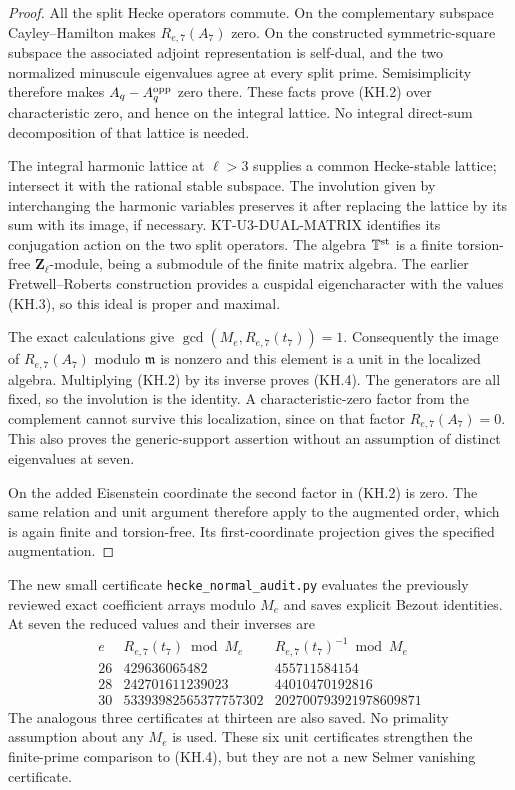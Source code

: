 \begin{proof}
All the split Hecke operators commute.  On the complementary
subspace Cayley--Hamilton makes $R_{e,7}(A_7)$ zero.  On the
constructed symmetric-square subspace the associated adjoint
representation is self-dual, and the two normalized minuscule
eigenvalues agree at every split prime.  Semisimplicity therefore
makes $A_q-A_q^{\rm opp}$ zero there.  These facts prove (KH.2)
over characteristic zero, and hence on the integral lattice.
No integral direct-sum decomposition of that lattice is needed.

The integral harmonic lattice at $\ell>3$ supplies a common
Hecke-stable lattice; intersect it with the rational stable
subspace.  The involution given by interchanging the harmonic
variables preserves it after replacing the lattice by its sum
with its image, if necessary.  KT-U3-DUAL-MATRIX identifies its
conjugation action on the two split operators.  The algebra
$\mathbb T^{\rm st}$ is a finite torsion-free
$\mathbf Z_\ell$-module, being a submodule of the finite matrix
algebra.  The earlier Fretwell--Roberts construction provides a
cuspidal eigencharacter with the values (KH.3), so this ideal is
proper and maximal.

The exact calculations give
$\gcd(M_e,R_{e,7}(t_7))=1$.  Consequently the image of
$R_{e,7}(A_7)$ modulo $\mathfrak m$ is nonzero and this element
is a unit in the localized algebra.  Multiplying (KH.2) by its
inverse proves (KH.4).  The generators are all fixed, so the
involution is the identity.  A characteristic-zero factor from
the complement cannot survive this localization, since on that
factor $R_{e,7}(A_7)=0$.  This also proves the generic-support
assertion without an assumption of distinct eigenvalues at seven.

On the added Eisenstein coordinate the second factor in (KH.2)
is zero.  The same relation and unit argument therefore apply
to the augmented order, which is again finite and torsion-free.
Its first-coordinate projection gives the specified augmentation.
\end{proof}

The new small certificate \texttt{hecke\_normal\_audit.py}
evaluates the previously reviewed exact coefficient arrays
modulo $M_e$ and saves explicit Bezout identities.  At seven
the reduced values and their inverses are
\[
\begin{array}{c|r|r}
e&R_{e,7}(t_7)\bmod M_e&R_{e,7}(t_7)^{-1}\bmod M_e\\\hline
26&429636065482&455711584154\\
28&242701611239023&44010470192816\\
30&53393982565377757302&202700793921978609871
\end{array}                                                   \tag{KH.5}
\]
The analogous three certificates at thirteen are also saved.
No primality assumption about any $M_e$ is used.  These six unit
certificates strengthen the finite-prime comparison to (KH.4),
but they are not a new Selmer vanishing certificate.

